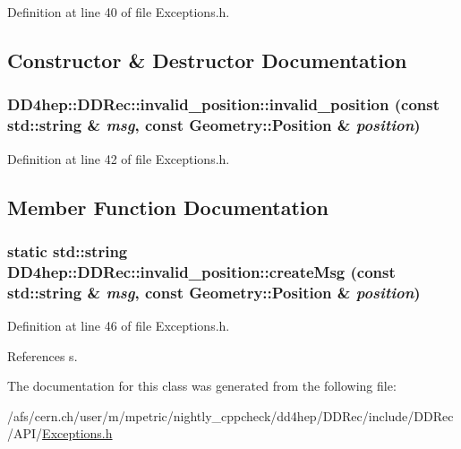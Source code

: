 Definition at line 40 of file Exceptions.h.

\subsection{Constructor \& Destructor Documentation}
\hypertarget{class_d_d4hep_1_1_d_d_rec_1_1invalid__position_aa71858d5b379311e9530ceabc0f99455}{
\subsubsection[{invalid\_\-position}]{\setlength{\rightskip}{0pt plus 5cm}DD4hep::DDRec::invalid\_\-position::invalid\_\-position (const std::string \& {\em msg}, \/  const {\bf Geometry::Position} \& {\em position})}}
\label{class_d_d4hep_1_1_d_d_rec_1_1invalid__position_aa71858d5b379311e9530ceabc0f99455}


Definition at line 42 of file Exceptions.h.

\subsection{Member Function Documentation}
\hypertarget{class_d_d4hep_1_1_d_d_rec_1_1invalid__position_af04d48b510823d5fd98ebb75a1ed52c0}{
\subsubsection[{createMsg}]{\setlength{\rightskip}{0pt plus 5cm}static std::string DD4hep::DDRec::invalid\_\-position::createMsg (const std::string \& {\em msg}, \/  const {\bf Geometry::Position} \& {\em position})}}
\label{class_d_d4hep_1_1_d_d_rec_1_1invalid__position_af04d48b510823d5fd98ebb75a1ed52c0}


Definition at line 46 of file Exceptions.h.

References s.

The documentation for this class was generated from the following file:\begin{DoxyCompactItemize}
\item 
/afs/cern.ch/user/m/mpetric/nightly\_\-cppcheck/dd4hep/DDRec/include/DDRec/API/\hyperlink{_d_d_rec_2include_2_d_d_rec_2_a_p_i_2_exceptions_8h}{Exceptions.h}\end{DoxyCompactItemize}
